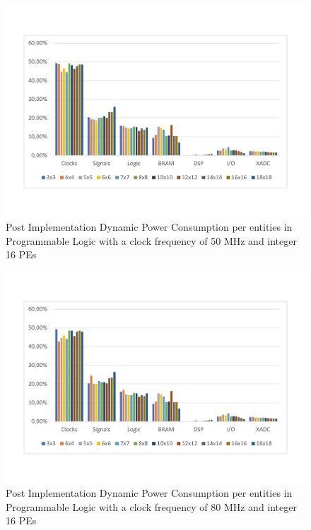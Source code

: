 \begin{itemize}
\begin{figure}[!htbp]
\label{fig:dynpowint16ent30}
\end{figure}
\begin{figure}[!htbp]
\centering
\captionsetup{justification=centering}
\includegraphics[scale=0.6,angle=0]{./figure/graphs/power_pldyn_div_int16_freq_50mhz.pdf}
\caption{Post Implementation Dynamic Power Consumption per entities in Programmable Logic with a clock frequency of 50 MHz and integer 16 PEs}
\label{fig:dynpowint16ent50}
\end{figure}
\begin{figure}[!htbp]
\centering
\captionsetup{justification=centering}
\includegraphics[scale=0.6,angle=0]{./figure/graphs/power_pldyn_div_int16_freq_80mhz.pdf}
\caption{Post Implementation Dynamic Power Consumption per entities in Programmable Logic with a clock frequency of 80 MHz and integer 16 PEs}

\end{figure}
\end{itemize}
